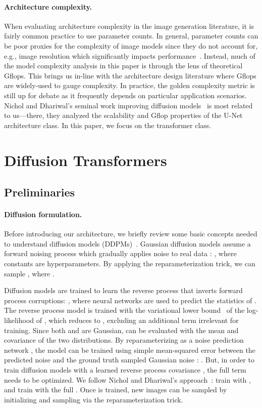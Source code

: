 \documentclass[10pt,twocolumn,letterpaper]{article}
\begin{document}
\vspace{-4mm}
\paragraph{Architecture complexity.}
When evaluating architecture complexity in the image generation literature, it is fairly common practice to use parameter counts. In general, parameter counts can be poor proxies for the complexity of image models since they do not account for, e.g., image resolution which significantly impacts performance~\cite{radosavovic2019network,radosavovic2020designing}. Instead, much of the model complexity analysis in this paper is through the lens of theoretical Gflops. This brings us in-line with the architecture design literature where Gflops are widely-used to gauge complexity. In practice, the golden complexity metric is still up for debate as it frequently depends on particular application scenarios. Nichol and Dhariwal's seminal work improving diffusion models~\cite{nichol2021improved,dhariwal2021adm} is most related to us---there, they analyzed the scalability and Gflop properties of the U-Net architecture class. In this paper, we focus on the transformer class.

\section{Diffusion Transformers}

\subsection{Preliminaries}

\paragraph{Diffusion formulation.} Before introducing our architecture, we briefly review some basic concepts needed to understand diffusion models (DDPMs)~\cite{sohl2015thermodynamics,ho2020ddpm}. Gaussian diffusion models assume a forward noising process which gradually applies noise to real data : , where constants  are hyperparameters. By applying the reparameterization trick, we can sample , where .

Diffusion models are trained to learn the reverse process that inverts forward process corruptions: , where neural networks are used to predict the statistics of . The reverse process model is trained with the variational lower bound~\cite{kingma2013auto} of the log-likelihood of , which reduces to , excluding an additional term irrelevant for training. Since both  and  are Gaussian,  can be evaluated with the mean and covariance of the two distributions. By reparameterizing  as a noise prediction network , the model can be trained using simple mean-squared error between the predicted noise  and the ground truth sampled Gaussian noise : . But, in order to train diffusion models with a learned reverse process covariance , the full  term needs to be optimized. We follow Nichol and Dhariwal's approach~\cite{nichol2021improved}: train  with , and train  with the full . Once  is trained, new images can be sampled by initializing  and sampling  via the reparameterization trick.
\end{document}
